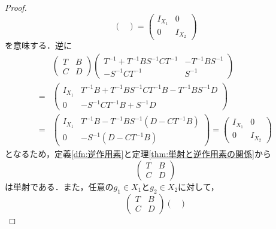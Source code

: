 \begin{proof}
\begin{equation*}
\begin{pmatrix}
    \end{pmatrix}
    =
    \begin{pmatrix}
      I_{X_1} & 0 \\
      0 & I_{X_2}
    \end{pmatrix}
  \end{equation*}
  を意味する．逆に
  \begin{equation*}
    \begin{split}
      &\begin{pmatrix}
        T & B \\
        C & D
      \end{pmatrix}
      \begin{pmatrix}
        T^{-1}+T^{-1}BS^{-1}CT^{-1} & -T^{-1}BS^{-1} \\
        -S^{-1}CT^{-1} & S^{-1}
      \end{pmatrix}
      \\=&
      \begin{pmatrix}
        I_{X_1} & T^{-1}B + T^{-1}BS^{-1}CT^{-1}B - T^{-1}BS^{-1}D \\
        0 & -S^{-1}CT^{-1}B+S^{-1}D
      \end{pmatrix}
      \\=&
      \begin{pmatrix}
        I_{X_1} & T^{-1}B - T^{-1}BS^{-1}(D-CT^{-1}B) \\
        0 & -S^{-1}(D-CT^{-1}B)
      \end{pmatrix}
      =
      \begin{pmatrix}
        I_{X_1} & 0 \\
        0 & I_{X_2}
      \end{pmatrix}
    \end{split}
  \end{equation*}
  となるため，定義\ref{dfn:逆作用素}と定理\ref{thm:単射と逆作用素の関係}から
  \begin{equation*}
    \begin{pmatrix}
      T & B \\
      C & D
    \end{pmatrix}
  \end{equation*}
  は単射である．また，任意の$g_1 \in X_1$と$g_2 \in X_2$に対して，
  \begin{equation*}
    \begin{pmatrix}
      T & B \\
      C & D
    \end{pmatrix}
    \begin{pmatrix}

\end{pmatrix}
\end{equation*}
\end{proof}

